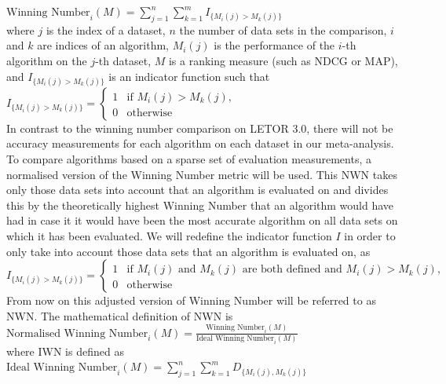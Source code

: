 $\text{Winning Number}_i(M) = \sum\nolimits_{j=1}^n \sum\nolimits_{k=1}^m I_{\{M_i(j)>M_k(j)\}}$\\

where $j$ is the index of a dataset, $n$ the number of data sets in the comparison, $i$ and $k$ are indices of an algorithm, $M_i(j)$ is the performance of the $i$-th algorithm on the $j$-th dataset, $M$ is a ranking measure (such as \ac{NDCG} or \ac{MAP}), and $I_{\{M_i(j)>M_k(j)\}}$ is an indicator function such that\\

$I_{\{M_i(j)>M_k(j)\}} = \begin{cases}
1 & \text{if } M_i(j) > M_k(j), \\
0 & \text{otherwise}
\end{cases}$\\

In contrast to the winning number comparison on LETOR 3.0, there will not be accuracy measurements for each algorithm on each dataset in our meta-analysis. To compare algorithms based on a sparse set of evaluation measurements, a normalised version of the Winning Number metric will be used. This \ac{NWN} takes only those data sets into account that an algorithm is evaluated on and divides this by the theoretically highest Winning Number that an algorithm would have had in case it it would have been the most accurate algorithm on all data sets on which it has been evaluated. We will redefine the indicator function $I$ in order to only take into account those data sets that an algorithm is evaluated on, as \\

$I_{\{M_i(j)>M_k(j)\}} = \begin{cases}
1 & \text{if } M_i(j) \text{ and } M_k(j) \text{ are both defined and } M_i(j) > M_k(j), \\
0 & \text{otherwise}
\end{cases}$\\

From now on this adjusted version of Winning Number will be referred to as \ac{NWN}. The mathematical definition of \ac{NWN} is\\

$\text{Normalised Winning Number}_i(M) = \frac{\text{Winning Number}_i(M)}{\text{Ideal Winning Number}_i(M)}$\\

\noindent
where \ac{IWN} is defined as\\

$\text{Ideal Winning Number}_i(M) = \sum\nolimits_{j=1}^n \sum\nolimits_{k=1}^m D_{\{M_i(j),M_k(j)\}}$\\

